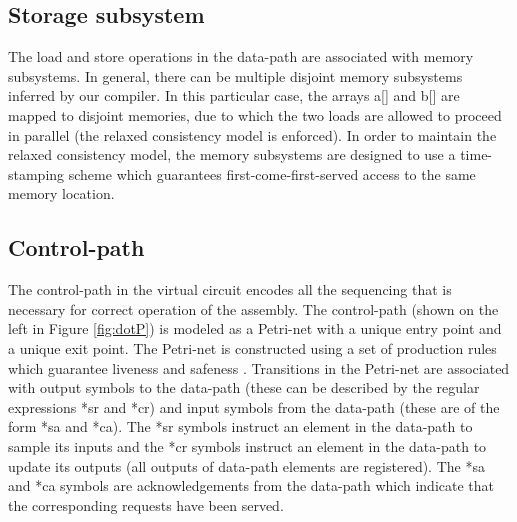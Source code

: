\documentclass[conference]{IEEEtran}
\begin{document}
\subsection{Storage subsystem}

The load and store operations in the data-path
are associated with memory subsystems.  In general, there
can be multiple disjoint memory subsystems inferred by our
compiler.  In this particular case, the arrays a[] and b[] 
are mapped to disjoint memories, due to which the two
loads are allowed to proceed in parallel (the relaxed consistency
model is enforced).
In order to maintain the relaxed consistency model, the
memory subsystems are designed to use a time-stamping 
scheme which guarantees first-come-first-served access to
the same memory location.

\subsection{Control-path}


The control-path in the virtual circuit encodes
all the sequencing that is necessary for correct
operation of the assembly.
The control-path (shown on the left
in Figure \ref{fig:dotP}) is modeled as a Petri-net with
a unique entry point and a unique exit point.  The Petri-net
is constructed using a set of production rules which guarantee
liveness and safeness \cite{ahirDsd2010}.  Transitions in the Petri-net
are associated with output symbols to the data-path (these can
be described by the regular expressions *sr and *cr)
and input symbols from the data-path (these are of the form *sa and
*ca).  The *sr symbols instruct an element in the data-path to
sample its inputs and the *cr symbols instruct an element in the
data-path to update its outputs (all outputs of data-path elements
are registered).  The *sa and *ca symbols are acknowledgements
from the data-path which indicate that the corresponding requests
have been served.  
\end{document}
